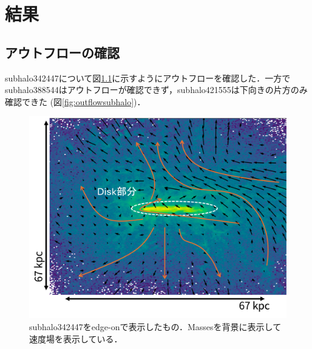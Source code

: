 \documentclass[main.tex]{subfiles}
\begin{document}
	\chapter{結果}
	
	\section{アウトフローの確認}
	subhalo342447について図\ref{fig:outflowsubhalo342447}に示すようにアウトフローを確認した．一方でsubhalo388544はアウトフローが確認できず，subhalo421555は下向きの片方のみ確認できた (図\ref{fig:outflowsubhalo})．
	
	
	\begin{figure}[htbp]
		\centering
		\includegraphics[width=0.6\linewidth]{pic/outflow_subhalo342447}
		\captionsetup{width=.8\linewidth}
		\caption{subhalo342447をedge-onで表示したもの．Massesを背景に表示して速度場を表示している．}
		\label{fig:outflowsubhalo342447}
	\end{figure}
	
\end{document}
